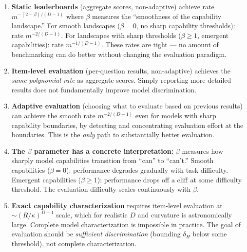 \begin{enumerate}
  \item \textbf{Static leaderboards} (aggregate scores, non-adaptive) achieve rate $m^{-(2-\beta)/(D-1)}$ where $\beta$ measures the ``smoothness of the capability landscape.'' For smooth landscapes ($\beta = 0$, no sharp capability thresholds): rate $m^{-2/(D-1)}$. For landscapes with sharp thresholds ($\beta \geq 1$, emergent capabilities): rate $m^{-1/(D-1)}$. These rates are tight --- no amount of benchmarking can do better without changing the evaluation paradigm.
  
  \item \textbf{Item-level evaluation} (per-question results, non-adaptive) achieves the \emph{same polynomial rate} as aggregate scores. Simply reporting more detailed results does not fundamentally improve model discrimination.
  
  \item \textbf{Adaptive evaluation} (choosing what to evaluate based on previous results) can achieve the smooth rate $m^{-2/(D-1)}$ even for models with sharp capability boundaries, by detecting and concentrating evaluation effort at the boundaries. This is the \emph{only} path to substantially better evaluation.
  
  \item \textbf{The $\beta$ parameter has a concrete interpretation:} $\beta$ measures how sharply model capabilities transition from ``can'' to ``can't.'' Smooth capabilities ($\beta = 0$): performance degrades gradually with task difficulty. Emergent capabilities ($\beta \geq 1$): performance drops off a cliff at some difficulty threshold. The evaluation difficulty scales continuously with $\beta$.
  
  \item \textbf{Exact capability characterization} requires item-level evaluation at $\sim (R/\kappa)^{D-1}$ scale, which for realistic $D$ and curvature is astronomically large. Complete model characterization is impossible in practice. The goal of evaluation should be \emph{sufficient discrimination} (bounding $\delta_H$ below some threshold), not complete characterization.
\end{enumerate}
